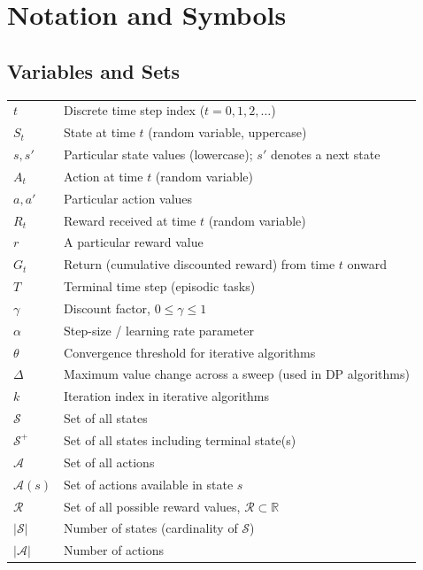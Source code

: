 \documentclass[10pt]{article}
\begin{document}
\section{Notation and Symbols}

\subsection{Variables and Sets}

\begin{tabular}{@{}l l@{}}
$t$ & Discrete time step index ($t = 0, 1, 2, \ldots$) \\
$S_t$ & State at time $t$ (random variable, uppercase) \\
$s, s'$ & Particular state values (lowercase); $s'$ denotes a next state \\
$A_t$ & Action at time $t$ (random variable) \\
$a, a'$ & Particular action values \\
$R_t$ & Reward received at time $t$ (random variable) \\
$r$ & A particular reward value \\
$G_t$ & Return (cumulative discounted reward) from time $t$ onward \\
$T$ & Terminal time step (episodic tasks) \\
$\gamma$ & Discount factor, $0 \leq \gamma \leq 1$ \\
$\alpha$ & Step-size / learning rate parameter \\
$\theta$ & Convergence threshold for iterative algorithms \\
$\Delta$ & Maximum value change across a sweep (used in DP algorithms) \\
$k$ & Iteration index in iterative algorithms \\
$\mathcal{S}$ & Set of all states \\
$\mathcal{S}^+$ & Set of all states including terminal state(s) \\
$\mathcal{A}$ & Set of all actions \\
$\mathcal{A}(s)$ & Set of actions available in state $s$ \\
$\mathcal{R}$ & Set of all possible reward values, $\mathcal{R} \subset \mathbb{R}$ \\
$|\mathcal{S}|$ & Number of states (cardinality of $\mathcal{S}$) \\
$|\mathcal{A}|$ & Number of actions \\
\end{tabular}
\end{document}
